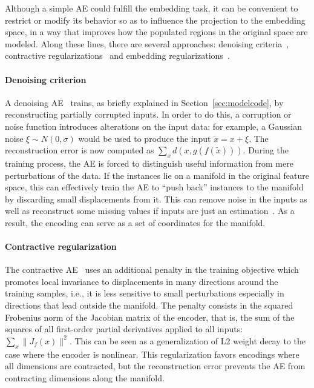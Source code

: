 \documentclass[
	fontsize=11pt, %
	twoside=false, %
	open=any, %
	secnumdepth=1, %
]{kaobook}
\begin{document}
Although a simple AE could fulfill the embedding task, it can be convenient to restrict or modify its behavior so as to influence the projection to the embedding space, in a way that improves how the populated regions in the original space are modeled. Along these lines, there are several approaches: denoising criteria~\cite{vincent2008extracting}, contractive regularizations~\cite{contractive} and embedding regularizations~\cite{yu2013embedding}.

\paragraph{Denoising criterion} A denoising AE~\cite{vincent2008extracting} trains, as briefly explained in Section~\ref{sec:modelcode}, by reconstructing partially corrupted inputs. In order to do this, a corruption or noise function introduces alterations on the input data: for example, a Gaussian noise $\xi\sim N(0,\sigma)$ would be used to produce the input $\tilde{x} = x + \xi$. The reconstruction error is now computed as $\sum_x d(x, g(f(\tilde x)))$. During the training process, the AE is forced to distinguish useful information from mere perturbations of the data. If the instances lie on a manifold in the original feature space, this can effectively train the AE to ``push back'' instances to the manifold by discarding small displacements from it. This can remove noise in the inputs as well as reconstruct some missing values if inputs are just an estimation~\cite{xie,li2015feature}. As a result, the encoding can serve as a set of coordinates for the manifold.

\paragraph{Contractive regularization} The contractive AE~\cite{contractive} uses an additional penalty in the training objective which promotes local invariance to displacements in many directions around the training samples, i.e., it is less sensitive to small perturbations especially in directions that lead outside the manifold. The penalty consists in the squared Frobenius norm of the Jacobian matrix of the encoder, that is, the sum of the squares of all first-order partial derivatives applied to all inputs: $\sum_x\lVert J_f(x)\rVert^2$. This can be seen as a generalization of L2 weight decay to the case where the encoder is nonlinear. This regularization favors encodings where all dimensions are contracted, but the reconstruction error prevents the AE from contracting dimensions along the manifold.
\end{document}
